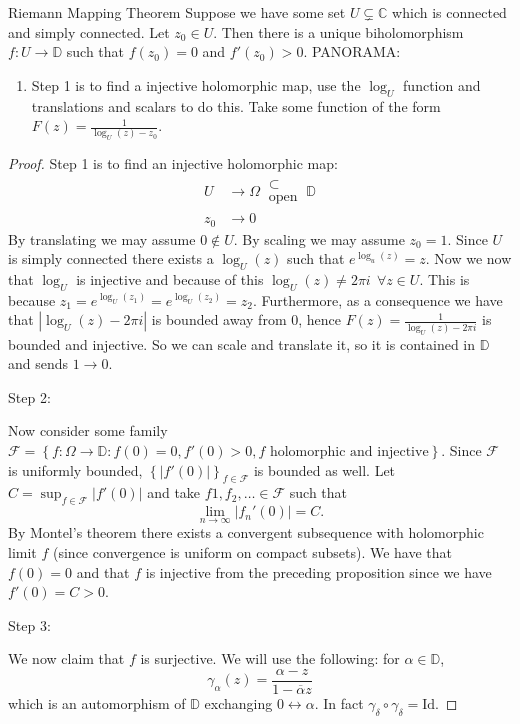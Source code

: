 \documentclass{article}
\begin{document}
\begin{thrm}{Riemann Mapping Theorem}{}
    Suppose we have some set \( U \subsetneq \mathbb{C}  \) which is connected and simply connected. Let \( z_0 \in U \). Then there is a unique biholomorphism \( f: U \to \mathbb{D}  \) such that \( f(z_0) = 0 \) and \( f'(z_0)>0 \). 
    \tcbline
PANORAMA:
\begin{enumerate}[]
    \item Step 1 is to find a injective holomorphic map, use the \( \log _{U}  \) function and translations and scalars to do this. Take some function of the form \( F(z) = \frac{1}{\log _{U} (z) - z_0} \). 
\end{enumerate}

\quad 

\begin{proof}
    Step 1 is to find an injective holomorphic map: 
    \begin{align*}
        U &\to  \Omega  \ \substack{\subset\\ \text{open}  } \ \mathbb{D} \\
        z_0 &\to 0
    \end{align*}
    By translating we may assume \( 0 \notin U \). By scaling we may assume \( z_0 = 1 \). Since \( U \) is simply connected there exists a \( \log _U(z) \) such that \( e^{\log _{u} (z)}  = z\). Now we now that \( \log _{U}  \)  is injective and because of this \( \log _{U} (z) \neq 2\pi i \ \  \forall z \in U\). This is because \( z_1 = e^{\log _U(z_1)} = e^{\log _U(z_2)} = z_2  \). Furthermore, as a consequence we have that \( \left\lvert \log _{U} (z) - 2\pi i \right\rvert  \) is bounded away from 0, hence \( F(z) = \frac{1}{\log _{U} (z)- 2\pi i} \) is bounded and injective. So we can scale and translate it, so it is contained in \( \mathbb{D}  \) and sends \( 1 \to  0 \).

    Step 2:

    Now consider some family \( \mathcal{F}   = \left\{ f:\Omega \to \mathbb{D} : f(0)= 0, f'(0)>0,  f \text{ holomorphic and injective}  \right\}  \). Since \( \mathcal{F} \) is uniformly bounded, \( \left\{ |f'(0)| \right\}_{f \in \mathcal{F} }  \) is bounded as well. Let \( C = \sup _{f\in \mathcal{F} }|f'(0)| \) and take \( f1,f_2, \dots \in \mathcal{F}  \) such that
    \[
        \lim_{n \to \infty} |f_n'(0)| = C.
    \] 
    By Montel's theorem there exists a convergent subsequence with holomorphic limit \( f \)  (since convergence is uniform on compact subsets). We have that \( f(0) = 0 \) and that \( f \) is injective from the preceding proposition since we have \( f'(0) = C > 0 \). 

    Step 3:

    We now claim that \( f \) is surjective. We will use the following: for \( \alpha  \in \mathbb{D}  \), 
    \[
        \gamma _\alpha (z) = \frac{\alpha - z}{1 - \overline{\alpha }z } 
    \]
    which is an automorphism of \( \mathbb{D}   \) exchanging \( 0 \leftrightarrow \alpha  \). In fact \( \gamma _\delta \circ \gamma _\delta = \mathrm{Id}  \).
\end{proof}

\end{thrm}
\end{document}
